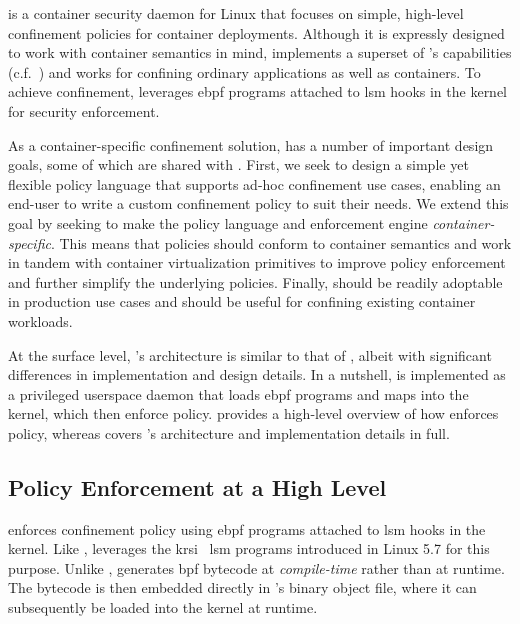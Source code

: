 \bpfcontain{} is a container security daemon for Linux that focuses on simple, high-level
confinement policies for container deployments. Although it is expressly designed to work
with container semantics in mind, \bpfcontain{} implements a superset of \bpfbox{}'s
capabilities (c.f.~) and works for confining ordinary applications as well
as containers. To achieve confinement, \bpfcontain{} leverages \gls{ebpf} programs
attached to \gls{lsm} hooks in the kernel for security enforcement.

As a container-specific confinement solution, \bpfcontain{} has a number of important
design goals, some of which are shared with \bpfbox{}. First, we seek to design a simple
yet flexible policy language that supports ad-hoc confinement use cases, enabling an
end-user to write a custom confinement policy to suit their needs. We extend this goal by
seeking to make the policy language and enforcement engine \textit{container-specific}.
This means that \bpfcontain{} policies should conform to container semantics and work in
tandem with container virtualization primitives to improve policy enforcement and further
simplify the underlying policies. Finally, \bpfcontain{} should be readily adoptable in
production use cases and should be useful for confining existing container workloads.

At the surface level, \bpfcontain{}'s architecture is similar to that of \bpfbox{}, albeit
with significant differences in implementation and design details. In a nutshell,
\bpfcontain{} is implemented as a privileged userspace daemon that loads \gls{ebpf}
programs and maps into the kernel, which then enforce policy.
 provides a high-level overview of how
\bpfcontain{} enforces policy, whereas  covers
\bpfcontain{}'s architecture and implementation details in full.

\subsection{Policy Enforcement at a High Level}%
\label{ss:bpfcontain-enforcement-overview}

\bpfcontain{} enforces confinement policy using \gls{ebpf} programs attached to \gls{lsm}
hooks in the kernel. Like \bpfbox{}, \bpfcontain{} leverages the
\gls{krsi}~\cite{singh2019_krsi} \gls{lsm} programs introduced in Linux 5.7 for this
purpose. Unlike \bpfbox{}, \bpfcontain{} generates \gls{bpf} bytecode at
\textit{compile-time} rather than at runtime. The bytecode is then embedded directly in
\bpfcontain{}'s binary object file, where it can subsequently be loaded into the kernel at
runtime.

